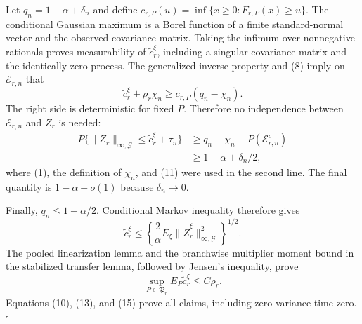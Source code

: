 Let \(q_n=1-\alpha+\delta_n\) and define
\(c_{r,P}(u)=\inf\{x\ge0:F_{r,P}(x)\ge u\}\).  The conditional Gaussian
maximum is a Borel function of a finite standard-normal vector and the
observed covariance matrix.  Taking the infimum over nonnegative rationals
proves measurability of \(\widetilde c_r^\xi\), including a singular
covariance matrix and the identically zero process.  The generalized-inverse
property and (8) imply on \(\mathcal E_{r,n}\) that
\[
 \widetilde c_r^\xi+\rho_r\chi_n
 \ge c_{r,P}(q_n-\chi_n).                                \tag{12}
\]
The right side is deterministic for fixed \(P\).  Therefore no independence
between \(\mathcal E_{r,n}\) and \(Z_r\) is needed:
\[
 \begin{aligned}
 P\{\|Z_r\|_{\infty,\mathcal G}
       \le\widetilde c_r^\xi+\tau_n\}
 &\ge q_n-\chi_n-P(\mathcal E_{r,n}^c)\\
 &\ge1-\alpha+\delta_n/2,
 \end{aligned}                                          \tag{13}
\]
where (1), the definition of \(\chi_n\), and (11) were used in the second
line.  The final quantity is \(1-\alpha-o(1)\) because \(\delta_n\to0\).

Finally, \(q_n\le1-\alpha/2\).  Conditional Markov inequality therefore
gives
\[
 \widetilde c_r^\xi
 \le\left\{\frac2\alpha E_\xi
 \|\widehat Z_r^\xi\|_{\infty,\mathcal G}^2\right\}^{1/2}. \tag{14}
\]
The pooled linearization lemma and the branchwise multiplier moment bound in
the stabilized transfer lemma, followed by Jensen's inequality, prove
\[
 \sup_{P\in\mathfrak P_r}E_P\widetilde c_r^\xi\le C\rho_r. \tag{15}
\]
Equations (10), (13), and (15) prove all claims, including zero-variance time
zero. \(\square\)
